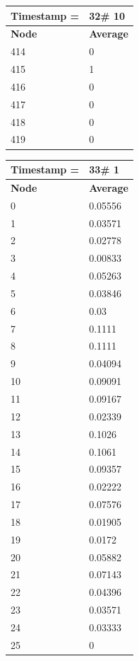 \begin{tabular}{|l||l|}
\hline
\textbf{Timestamp =} & \textbf{32}\# 10\\\hline
	\textbf{Node} & \textbf{Average} \\ \hline
\hline
	414 & 0 \\ \hline
	415 & 1 \\ \hline
	416 & 0 \\ \hline
	417 & 0 \\ \hline
	418 & 0 \\ \hline
	419 & 0 \\ \hline
\end{tabular}

\begin{tabular}{|l||l|}
\hline
\textbf{Timestamp =} & \textbf{33}\# 1\\\hline
	\textbf{Node} & \textbf{Average} \\ \hline
\hline
	0 & 0.05556 \\ \hline
	1 & 0.03571 \\ \hline
	2 & 0.02778 \\ \hline
	3 & 0.00833 \\ \hline
	4 & 0.05263 \\ \hline
	5 & 0.03846 \\ \hline
	6 & 0.03 \\ \hline
	7 & 0.1111 \\ \hline
	8 & 0.1111 \\ \hline
	9 & 0.04094 \\ \hline
	10 & 0.09091 \\ \hline
	11 & 0.09167 \\ \hline
	12 & 0.02339 \\ \hline
	13 & 0.1026 \\ \hline
	14 & 0.1061 \\ \hline
	15 & 0.09357 \\ \hline
	16 & 0.02222 \\ \hline
	17 & 0.07576 \\ \hline
	18 & 0.01905 \\ \hline
	19 & 0.0172 \\ \hline
	20 & 0.05882 \\ \hline
	21 & 0.07143 \\ \hline
	22 & 0.04396 \\ \hline
	23 & 0.03571 \\ \hline
	24 & 0.03333 \\ \hline
	25 & 0 \\ \hline

\end{tabular}
